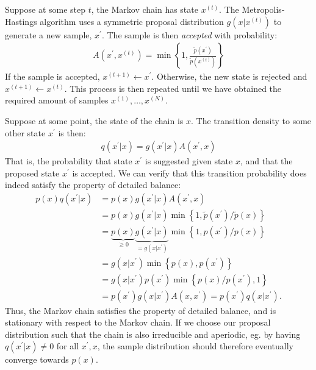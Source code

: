 
Suppose at some step $t$, the Markov chain has state $x^{(t)}$. The Metropolis-Hastings algorithm uses a symmetric proposal distribution $g(x|x^{(t)})$ to generate a new sample, $x^\prime$. The sample is then \emph{accepted} with probability:
\begin{align*}
    A(x^{\prime}, x^{(t)}) = \min\left\{1, \frac{\tilde{p}(x^\prime)}{\tilde{p}(x^{(t)})}\right\}
\end{align*}
If the sample is accepted, $x^{(t+1)} \gets x^\prime$. Otherwise, the new state is rejected and $x^{(t+1)} \gets x^{(t)}$. This process is then repeated until we have obtained the required amount of samples $x^{(1)},\dots,x^{(N)}$. 

Suppose at some point, the state of the chain is $x$. The transition density to some other state $x^\prime$ is then:
\begin{align*}
    q(x^\prime|x) = g(x^\prime | x) A(x^\prime, x)
\end{align*}
That is, the probability that state $x^\prime$ is suggested given state $x$, and that the proposed state $x^\prime$ is accepted. We can verify that this transition probability does indeed satisfy the property of detailed balance:
\begin{align*}
    p(x)q(x^\prime|x) &= p(x)g(x^\prime | x) A(x^\prime, x) \\
                      &= p(x)g(x^\prime | x) \min\left\{1,  \tilde{p}(x^\prime) / \tilde{p}(x)\right\} \\
                      &= \underbrace{p(x)}_{\geq 0} \underbrace{g(x^\prime | x)}_{=g(x | x^\prime)} \min\left\{1,  p(x^\prime) / p(x)\right\} \\
                      &= g(x | x^\prime) \min\left\{p(x), p(x^\prime)\right\} \\
                      &= g(x | x^\prime) p(x^\prime) \min\left\{p(x)/p(x^\prime), 1\right\} \\
                      &= p(x^\prime) g(x | x^\prime)  A(x ,x^\prime) = p(x^\prime) q(x|x^\prime).
\end{align*}
Thus, the Markov chain satisfies the property of detailed balance, and is stationary with respect to the Markov chain. If we choose our proposal distribution such that the chain is also irreducible and aperiodic, eg. by having $q(x^\prime|x) \neq 0$ for all $x^\prime,x$, the sample distribution should therefore eventually converge towards $p(x)$. 

